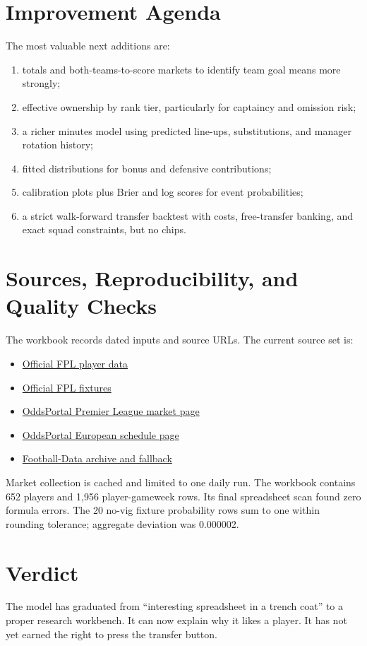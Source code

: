 \documentclass[11pt,a4paper]{article}
\begin{document}
\section{Improvement Agenda}

The most valuable next additions are:

\begin{enumerate}
  \item totals and both-teams-to-score markets to identify team goal means more strongly;
  \item effective ownership by rank tier, particularly for captaincy and omission risk;
  \item a richer minutes model using predicted line-ups, substitutions, and manager rotation history;
  \item fitted distributions for bonus and defensive contributions;
  \item calibration plots plus Brier and log scores for event probabilities;
  \item a strict walk-forward transfer backtest with costs, free-transfer banking, and exact squad constraints, but no chips.
\end{enumerate}

\section{Sources, Reproducibility, and Quality Checks}

The workbook records dated inputs and source URLs. The current source set is:

\begin{itemize}
  \item \href{https://fantasy.premierleague.com/api/bootstrap-static/}{Official FPL player data}
  \item \href{https://fantasy.premierleague.com/api/fixtures/}{Official FPL fixtures}
  \item \href{https://www.oddsportal.com/football/england/premier-league/}{OddsPortal Premier League market page}
  \item \href{https://www.oddsportal.com/football/europe/champions-league/}{OddsPortal European schedule page}
  \item \href{https://www.football-data.co.uk/mmz4281/2627/E0.csv}{Football-Data archive and fallback}
\end{itemize}

Market collection is cached and limited to one daily run. The workbook contains 652 players and 1,956 player-gameweek rows. Its final spreadsheet scan found zero formula errors. The 20 no-vig fixture probability rows sum to one within rounding tolerance; aggregate deviation was 0.000002.

\section{Verdict}

The model has graduated from ``interesting spreadsheet in a trench coat'' to a proper research workbench. It can now explain why it likes a player. It has not yet earned the right to press the transfer button.
\end{document}
